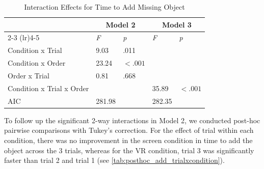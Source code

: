 \documentclass[letterpaper, 10 pt, conference]{ieeeconf}  %
\begin{document}
%

\begin{table}[h!]
    \centering
    \footnotesize
    \caption{Interaction Effects for Time to Add Missing Object}
    \label{tab:add_interact}
    \begin{tabular}{lllll}
    \toprule
                          & \multicolumn{2}{c}{\textbf{Model 2}} &  \multicolumn{2}{c}{\textbf{Model 3}}  \\ \cmidrule(lr){2-3} \cmidrule(lr){4-5} 
                          & \textit{F}        & \textit{p} &  \textit{F}       & \textit{p} \\ \midrule
      Condition x Trial   & 9.03 & .011 & & \\
      Condition x Order   &  23.24 & $<.001$  & & \\
      Order x Trial       &  0.81 & .668  & & \\
      Condition x Trial x Order &  &  & 35.89 & $<.001$ \\ \addlinespace \midrule
      AIC                  & 281.98 & & 282.35 & \\ \bottomrule
    \end{tabular}
    \end{table}

To follow up the significant 2-way interactions in Model 2, we conducted post-hoc pairwise comparisons with Tukey's correction. For the effect of trial within each condition, there was no improvement in the screen condition in time to add the object across the 3 trials, whereas for the VR condition, trial 3 was significantly faster than trial 2 and trial 1 (see \cref{tab:posthoc_add_trialxcondition}). 
\end{document}
